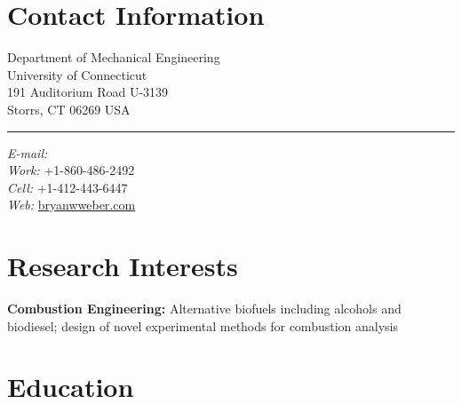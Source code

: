 



\listoftodos
\vspace{1em}

\section{Contact Information}

%
\newlength{\rcolwidth}\setlength{\rcolwidth}{2.5in}%
\newlength{\ccolwidth}\setlength{\ccolwidth}{30pt}
\newlength{\lcolwidth}\setlength{\lcolwidth}{\textwidth-\rcolwidth-\ccolwidth}
%
\begin{varwidth}{\lcolwidth}%
Department of Mechanical Engineering\\
University of Connecticut\\
191 Auditorium Road U-3139\\
Storrs, CT 06269 USA%
\end{varwidth}%
\hfill
\begin{varwidth}{\ccolwidth}
\rule{0.5pt}{4\baselineskip} %
\end{varwidth}%
\hfill
\begin{varwidth}{\rcolwidth}%
\textit{E-mail:} \\
\textit{Work:} +1-860-486-2492 \\
\textit{Cell:} +1-412-443-6447 \\
\textit{Web:} \href{http://bryanwweber.com}{bryanwweber.com}
\end{varwidth}%

\section{Research Interests}
{\bf Combustion Engineering:} Alternative biofuels including alcohols and biodiesel; design of novel experimental methods for combustion analysis

\section{Education}

